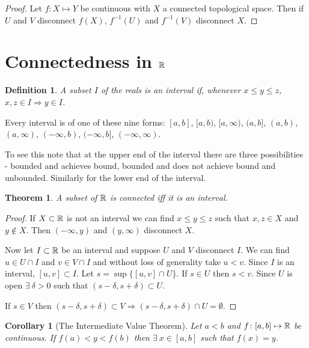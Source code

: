 \documentclass{notes}
\theoremstyle{plain}
\newtheorem{theorem}[proposition]{Theorem}
\newtheorem{corollary}[proposition]{Corollary}
\newtheorem{definition}[proposition]{Definition}
\begin{document}
\begin{proof}
  Let $f \colon X \mapsto Y$ be continuous with $X$ a connected
  topological space.  Then if $U$ and $V$ disconnect $f(X)$,
  $f^{-1}(U)$ and $f^{-1}(V)$ disconnect $X$.
\end{proof}

\section{Connectedness in $\mathbb{R}$}

\begin{definition}
A subset $I$ of the reals is an interval if, whenever
$x \le y \le z$, $x, z \in I \Rightarrow y \in I$.
\end{definition}

Every interval is of one of these nine forms: $[a,b]$, $[a,b)$, $[a, \infty)$,
$(a, b]$, $(a,b)$, $(a,\infty)$, $(-\infty,b)$, $(-\infty,b]$,
$(-\infty, \infty)$. 

To see this note that at the upper end of the interval there are three
possibilities - bounded and achieves bound, bounded and does not achieve bound
and unbounded.  Similarly for the lower end of the interval.

\begin{theorem}
A subset of $\mathbb{R}$ is connected iff it is an interval.
\end{theorem}

\begin{proof}
If $X \subset \mathbb{R}$ is not an interval we can find $x \le y \le z$ such that
$x, z \in X$ and $y \notin X$.  Then $(-\infty,y)$ and $(y,\infty)$ disconnect
$X$.

Now let $I \subset \mathbb{R}$ be an interval and suppose $U$ and $V$ disconnect $I$.
We can find $u \in U \cap I$ and $v \in V \cap I$ and without loss of
generality take $u < v$.  Since $I$ is an interval, $[u,v] \subset I$.  Let
$s = \sup \{ [u,v] \cap U \}$.  If $s \in U$ then $s < v$.  Since $U$ is open
$\exists\ \delta > 0$ such that $(s-\delta,s+\delta) \subset U$.

If $s \in V$ then $(s - \delta,s + \delta) \subset V \Rightarrow
(s-\delta, s+\delta) \cap U = \emptyset$.
\end{proof}

\begin{corollary}[The Intermediate Value Theorem]%
Let $a < b$ and $f \colon [a,b] \mapsto \mathbb{R}$ be continuous.  If $f(a) < y < f(b)$
then $\exists\ x \in [a,b]$ such that $f(x) = y$.
\end{corollary}
\end{document}
